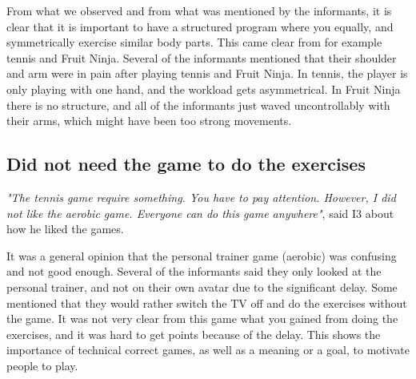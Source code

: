 From what we observed and from what was mentioned by the informants, it is clear that it is important to have a structured program where you equally, and symmetrically exercise similar body parts. This came clear from for example tennis and Fruit Ninja. Several of the informants mentioned that their shoulder and arm were in pain after playing tennis and Fruit Ninja. In tennis, the player is only playing with one hand, and the workload gets asymmetrical. In Fruit Ninja there is no structure, and all of the informants just waved uncontrollably with their arms, which might have been too strong movements.

\subsection{Did not need the game to do the exercises}
\emph{"The tennis game require something. You have to pay attention. However, I did not like the aerobic game. Everyone can do this game anywhere"}, said I3 about how he liked the games. 

It was a general opinion that the personal trainer game (aerobic) was confusing and not good enough. Several of the informants said they only looked at the personal trainer, and not on their own avatar due to the significant delay. Some mentioned that they would rather switch the TV off and do the exercises without the game. It was not very clear from this game what you gained from doing the exercises, and it was hard to get points because of the delay. This shows the importance of technical correct games, as well as a meaning or a goal, to motivate people to play. 

